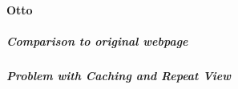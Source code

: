 





\paragraph{Otto}















\subparagraph{Comparison to original webpage}






\subparagraph{Problem with Caching and Repeat View}


